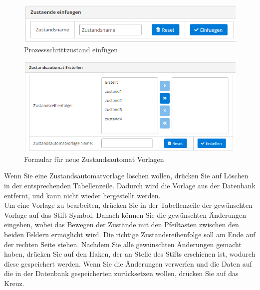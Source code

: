 \documentclass[enabledeprecatedfontcommands,fontsize=12pt,paper=a4,twoside]{scrartcl}
\begin{document}
\begin{figure}[h!]
\begin{center}
 \includegraphics[width=\textwidth]{screenshots/pk/prozessschrittzustandeinfugen.png}
  \caption{Prozessschrittzustand einfügen}
  \label{fig:boat2}
\end{center}
\end{figure}

\begin{figure}[h!]
\begin{center}
 \includegraphics[width=\textwidth]{screenshots/pk/prozessschrittzustandsautomaterstellen.png}
  \caption{Formular für neue Zustandsautomat Vorlagen}
  \label{fig:boat2}
\end{center}
\end{figure}


Wenn Sie eine Zustandsautomatvorlage löschen wollen, drücken Sie auf Löschen in der entsprechenden Tabellenzeile. Dadurch wird die Vorlage aus der Datenbank entfernt, und kann nicht wieder hergestellt werden. \\


Um eine Vorlage zu bearbeiten, drücken Sie in der Tabellenzeile der gewünschten Vorlage auf das Stift-Symbol. Danach können Sie die gewünschten Änderungen eingeben, wobei das Bewegen der Zustände mit den Pfeiltasten zwischen den beiden Feldern ermöglicht wird. Die richtige Zustandsreihenfolge soll am Ende auf der rechten Seite stehen. Nachdem Sie alle gewünschten Änderungen gemacht haben, drücken Sie auf den Haken, der an Stelle des Stifts erschienen ist, wodurch diese gespeichert werden. Wenn Sie die Änderungen verwerfen und die Daten auf die in der Datenbank gespeicherten zurücksetzen wollen, drücken Sie auf das Kreuz. \\
\end{document}
